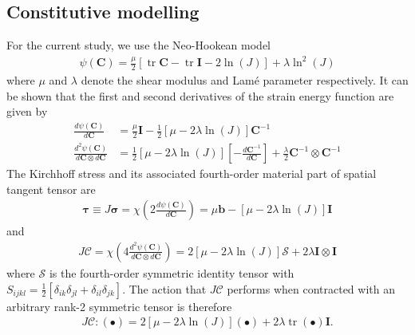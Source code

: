 \documentclass[times,doublespace]{nmeauth}
\DeclareMathOperator{\trace}{tr}
\begin{document}
\subsection{Constitutive modelling}

For the current study, we use the Neo-Hookean model
\begin{gather}
\psi \left( \mathbf{C} \right)
  = \frac{\mu}{2} \left[ \trace{\mathbf{C}} - \trace{\mathbf{I}} - 2 \ln\left( J \right) \right]
  + \lambda \ln^{2}\left( J \right)
\end{gather}
where $\mu$ and $\lambda$ denote the shear modulus and Lam\'{e} parameter respectively. It can be shown that the first and second derivatives of the strain energy function are given by
\begin{align}
\frac{d \psi \left( \mathbf{C} \right)}{d \mathbf{C}}
  &= \frac{\mu}{2} \mathbf{I} - \frac{1}{2} \left[ \mu - 2\lambda\ln\left( J \right) \right] \mathbf{C}^{-1} \\
\frac{d^{2} \psi \left( \mathbf{C} \right)}{d \mathbf{C} \otimes d \mathbf{C}}
  &= \frac{1}{2}\left[ \mu - 2\lambda\ln\left( J \right) \right] \left[ - \frac{d \mathbf{C}^{-1}}{d \mathbf{C}} \right]
  + \frac{\lambda}{2} \mathbf{C}^{-1} \otimes \mathbf{C}^{-1}
\end{align}
The Kirchhoff stress and its associated {\color{red}fourth-order material part of spatial tangent tensor} are
\begin{gather}
\boldsymbol{\tau}
  \equiv J \boldsymbol{\sigma}
  = \chi\left( 2 \frac{d \psi \left( \mathbf{C} \right)}{d \mathbf{C}} \right)
  = \mu \mathbf{b} - \left[ \mu - 2\lambda\ln\left( J \right) \right] \mathbf{I}
\end{gather}
and
\begin{gather}
J \boldsymbol{\mathcal{C}}
  = \chi\left( 4 \frac{d^{2} \psi \left( \mathbf{C} \right)}{d \mathbf{C} \otimes d \mathbf{C}} \right)
  = 2 \left[ \mu - 2\lambda\ln\left( J \right) \right] \boldsymbol{\mathcal{S}}
  + 2 \lambda \mathbf{I} \otimes \mathbf{I}
\end{gather}
where $\boldsymbol{\mathcal{S}}$ is the fourth-order symmetric identity tensor
{\color{red}with $S_{ijkl}=\frac{1}{2}\left[\delta_{ik}\delta_{jl}+\delta_{il}\delta_{jk}\right]$}.
The action that $J \boldsymbol{\mathcal{C}}$ performs when contracted with an arbitrary rank-2 symmetric tensor is therefore
\begin{gather}
J \boldsymbol{\mathcal{C}} : \left( \bullet \right)
  = 2 \left[ \mu - 2\lambda\ln\left( J \right) \right] \left( \bullet \right)
  + 2 \lambda \trace\left( \bullet \right) \mathbf{I}.
\label{eq:simplified_action}
\end{gather}
\end{document}
